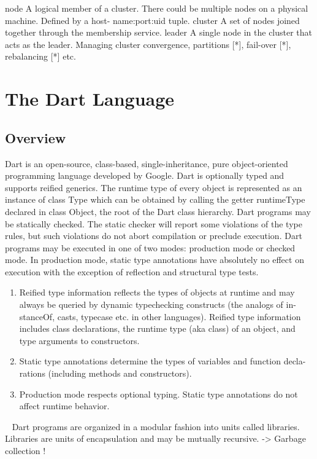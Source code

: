   node A logical member of a cluster. There could be multiple nodes on a physical machine. Defined by a host- name:port:uid tuple.
  cluster A set of nodes joined together through the membership service.
  leader A single node in the cluster that acts as the leader. Managing cluster convergence, partitions [*], fail-over [*], rebalancing [*] etc.


\section{The Dart Language}
  \subsection{Overview}
  Dart is an open-source, class-based, single-inheritance, pure object-oriented programming language developed by Google. Dart is optionally typed and supports reified generics. The runtime type of every object is represented as an instance of class Type which can be obtained by calling the getter runtimeType declared in class Object, the root of the Dart class hierarchy.
  Dart programs may be statically checked. The static checker will report some violations of the type rules, but such violations do not abort compilation or preclude execution.
  Dart programs may be executed in one of two modes: production mode or checked mode. In production mode, static type annotations have absolutely no effect on execution with the exception of reflection and structural type tests.
  \begin{enumerate}
  \item Reified type information reflects the types of objects at runtime and may always be queried by dynamic typechecking constructs (the analogs of in- stanceOf, casts, typecase etc. in other languages). Reified type information includes class declarations, the runtime type (aka class) of an object, and type arguments to constructors.
  \item Static type annotations determine the types of variables and function decla- rations (including methods and constructors).
  \item Production mode respects optional typing. Static type annotations do not affect runtime behavior.
  \end{enumerate}
~\parencite{dartEcma}
Dart programs are organized in a modular fashion into units called libraries. Libraries are units of encapsulation and may be mutually recursive.
\newline
-> Garbage collection !

